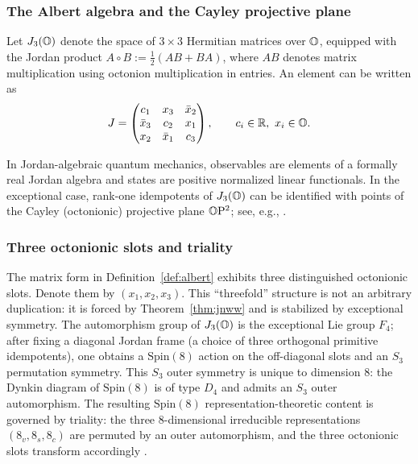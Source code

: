 \subsubsection{The Albert algebra and the Cayley projective plane}
\begin{definition}
\label{def:albert}
Let $J_3(\mathbb{O})$ denote the space of $3\times 3$ Hermitian matrices over $\mathbb{O}$,
equipped with the Jordan product $A\circ B:=\tfrac12(AB+BA)$, where $AB$ denotes matrix multiplication using octonion multiplication in entries.
An element can be written as
$$
J=\begin{pmatrix}
c_1 & x_3 & \bar{x}_2 \\
\bar{x}_3 & c_2 & x_1 \\
x_2 & \bar{x}_1 & c_3
\end{pmatrix},
\qquad c_i\in\mathbb{R},\ x_i\in\mathbb{O}.
$$
\end{definition}

\begin{remark}
In Jordan-algebraic quantum mechanics, observables are elements of a formally real Jordan algebra and states are positive normalized linear functionals.
In the exceptional case, rank-one idempotents of $J_3(\mathbb{O})$ can be identified with points of the Cayley (octonionic) projective plane $\mathbb{O}\mathrm{P}^2$; see, e.g., \cite{Baez2002,ConwaySmith2003}.
\end{remark}

\subsubsection{Three octonionic slots and triality}
The matrix form in Definition~\ref{def:albert} exhibits three distinguished octonionic slots. Denote them by $(x_1,x_2,x_3)$.
This ``threefold'' structure is not an arbitrary duplication: it is forced by Theorem~\ref{thm:jnww} and is stabilized by exceptional symmetry.
The automorphism group of $J_3(\mathbb{O})$ is the exceptional Lie group $F_4$; after fixing a diagonal Jordan frame (a choice of three orthogonal primitive idempotents), one obtains a $\mathrm{Spin}(8)$ action on the off-diagonal slots and an $S_3$ permutation symmetry.
This $S_3$ outer symmetry is unique to dimension $8$: the Dynkin diagram of $\mathrm{Spin}(8)$ is of type $D_4$ and admits an $S_3$ outer automorphism.
The resulting $\mathrm{Spin}(8)$ representation-theoretic content is governed by triality: the three $8$-dimensional irreducible representations $(8_v,8_s,8_c)$ are permuted by an outer automorphism, and the three octonionic slots transform accordingly \cite{Baez2002,GunaydinGursey1973}.

